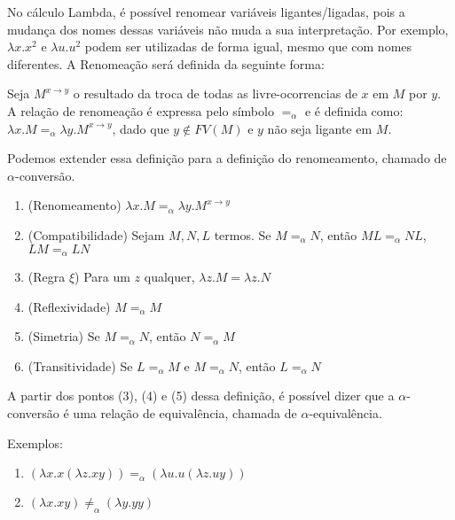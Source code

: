 \documentclass[../main.tex]{subfiles}
\begin{document}
No cálculo Lambda, é possível renomear variáveis ligantes/ligadas, pois a mudança dos nomes dessas variáveis não muda a sua interpretação. Por exemplo, $\lambda x. x^2$ e $\lambda u . u^2$ podem ser utilizadas de forma igual, mesmo que com nomes diferentes. A Renomeação será definida da seguinte forma:

\begin{definition}
    Seja $M^{x \to y}$ o resultado da troca de todas as livre-ocorrencias de $x$ em $M$ por $y$. A relação de renomeação é expressa pelo símbolo $=_{\alpha}$ e é definida como: $\lambda x . M =_{\alpha} \lambda y . M^{x \to y}$, dado que $y \not\in FV(M)$ e $y$ não seja ligante em $M$.
\end{definition}

Podemos extender essa definição para a definição do renomeamento, chamado de $\alpha$-conversão.

\begin{definition}
    \hfill
    \begin{enumerate}
        \item (Renomeamento) $\lambda x. M =_ {\alpha} \lambda y . M^{x \to y}$
        \item (Compatibilidade) Sejam $M, N, L$ termos. Se $M =_ {\alpha} N$, então $ML =_ {\alpha} NL$, $LM =_ {\alpha} LN$ 
        \item (Regra $\xi$) Para um $z$ qualquer, $\lambda z . M = \lambda z . N$
        \item (Reflexividade) $M =_ {\alpha} M$
        \item (Simetria) Se $M =_ {\alpha} N$, então $N =_ {\alpha} M$
        \item (Transitividade) Se $L =_ {\alpha} M$ e $M =_ {\alpha} N$, então $L =_ {\alpha} N$
    \end{enumerate}
\end{definition}

A partir dos pontos (3), (4) e (5) dessa definição, é possível dizer que a $\alpha$-conversão é uma relação de equivalência, chamada de $\alpha$-equivalência.

Exemplos: 

\begin{enumerate}
    \item $(\lambda x . x (\lambda z . xy)) =_ {\alpha} (\lambda u . u (\lambda z . uy))$
    \item $(\lambda x . xy) \neq_{\alpha} (\lambda y . yy)$
\end{enumerate}
\end{document}
